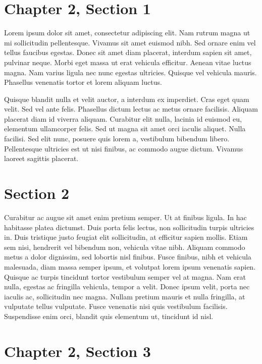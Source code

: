 \section{Chapter 2, Section 1}

Lorem ipsum dolor sit amet, consectetur adipiscing elit. Nam rutrum magna ut mi sollicitudin pellentesque. Vivamus sit amet euismod nibh. Sed ornare enim vel tellus faucibus egestas. Donec sit amet diam placerat, interdum sapien sit amet, pulvinar neque. Morbi eget massa ut erat vehicula efficitur. Aenean vitae luctus magna. Nam varius ligula nec nunc egestas ultricies. Quisque vel vehicula mauris. Phasellus venenatis tortor et lorem aliquam luctus.

Quisque blandit nulla et velit auctor, a interdum ex imperdiet. Cras eget quam velit. Sed vel ante felis. Phasellus dictum lectus ac metus ornare facilisis. Aliquam placerat diam id viverra aliquam. Curabitur elit nulla, lacinia id euismod eu, elementum ullamcorper felis. Sed ut magna sit amet orci iaculis aliquet. Nulla facilisi. Sed elit nunc, posuere quis lorem a, vestibulum bibendum libero. Pellentesque ultricies est ut nisi finibus, ac commodo augue dictum. Vivamus laoreet sagittis placerat.

\newpage

\section{Section 2}

Curabitur ac augue sit amet enim pretium semper. Ut at finibus ligula. In hac habitasse platea dictumst. Duis porta felis lectus, non sollicitudin turpis ultricies in. Duis tristique justo feugiat elit sollicitudin, at efficitur sapien mollis. Etiam sem nisi, hendrerit vel bibendum non, vehicula vitae nibh. Aliquam commodo metus a dolor dignissim, sed lobortis nisl finibus. Fusce finibus, nibh et vehicula malesuada, diam massa semper ipsum, et volutpat lorem ipsum venenatis sapien. Quisque ac turpis tincidunt tortor vestibulum semper vel at magna. Nam erat nulla, egestas ac fringilla vehicula, tempor a velit. Donec ipsum velit, porta nec iaculis ac, sollicitudin nec magna. Nullam pretium mauris et nulla fringilla, at vulputate tellus vulputate. Fusce venenatis nisi quis vestibulum facilisis. Suspendisse enim orci, blandit quis elementum ut, tincidunt id nisl.

\newpage

\section{Chapter 2, Section 3}

